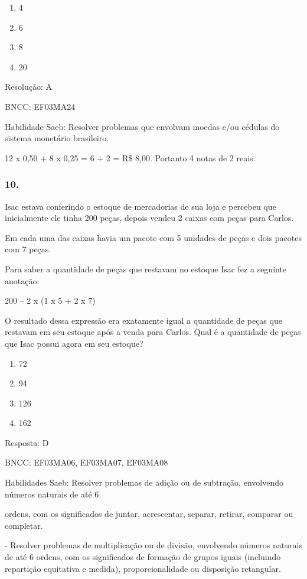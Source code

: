 \begin{enumerate}
\def\labelenumi{\alph{enumi})}
\item
  4
\item
  6
\item
  8
\item
  20
\end{enumerate}

Resolução: A

BNCC: EF03MA24

Habilidade Saeb: Resolver problemas que envolvam moedas e/ou cédulas do
sistema monetário brasileiro.

12 x 0,50 + 8 x 0,25 = 6 + 2 = R\$ 8,00. Portanto 4 notas de 2 reais.

\subsubsection{10.}\label{section-150}

Isac estava conferindo o estoque de mercadorias de sua loja e percebeu
que inicialmente ele tinha 200 peças, depois vendeu 2 caixas com peças
para Carlos.

Em cada uma das caixas havia um pacote com 5 unidades de peças e dois
pacotes com 7 peças.

Para saber a quantidade de peças que restavam no estoque Isac fez a
seguinte anotação:

200 -- 2 x (1 x 5 + 2 x 7)

O resultado dessa expressão era exatamente igual a quantidade de peças
que restavam em seu estoque após a venda para Carlos. Qual é a
quantidade de peças que Isac possui agora em seu estoque?

\begin{enumerate}
\def\labelenumi{\alph{enumi})}
\item
  72
\item
  94
\item
  126
\item
  162
\end{enumerate}

Resposta: D

BNCC: EF03MA06, EF03MA07, EF03MA08

Habilidades Saeb: Resolver problemas de adição ou de subtração,
envolvendo números naturais de até 6

ordens, com os significados de juntar, acrescentar, separar, retirar,
comparar ou completar.

- Resolver problemas de multiplicação ou de divisão, envolvendo números
naturais de até 6 ordens, com os significados de formação de grupos
iguais (incluindo repartição equitativa e medida), proporcionalidade ou
disposição retangular.

